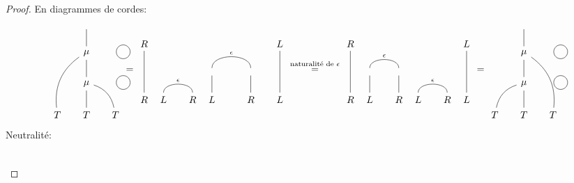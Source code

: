 \documentclass[math, info]{cours}
\begin{document}
\begin{proof}
	En diagrammes de cordes:
	\begin{equation*}
		\begin{tikzcd}[remember picture]
			&[-10pt]\phantom{}\ar[d, no head] &[-10pt]\\
			& |[alias=mu]|\mu & \\
			& |[alias=mu2]|\mu\ar[u, no head] & \\
			T\ar[uur, no head, bend left] & T\ar[u, no head] & T\ar[ul, bend right, no head]
		\end{tikzcd}
		\begin{tikzpicture}[remember picture, overlay]
			\draw (mu) circle (.25cm) {};
			\draw (mu2) circle (.25cm) {};
		\end{tikzpicture}
		 =
		 \begin{tikzcd}
			 R &[-20pt] &[-10pt] &[-20pt] & &[-10pt] L\\
			 & & & \phantom{}\ar[r, bend left=90, no head, "\epsilon"] & \phantom{} & \\
			 R\ar[uu, no head] & L\ar[r, bend left=90, no head, "\epsilon"] & R & L\ar[u, no head] & R\ar[u, no head] & L\ar[uu, no head]
		 \end{tikzcd}
		 \overset{\text{naturalité de $\epsilon$}}{=}
		 \begin{tikzcd}
			 R &[-20pt] &[-10pt] &[-20pt] &[-10pt] &[-20pt] L\\
			 & \phantom{}\ar[r, bend left=90, no head, "\epsilon"] & \phantom{} & & & \\
			 R\ar[uu, no head] & L\ar[u, no head] & R\ar[u, no head] &  L\ar[r, bend left=90, "\epsilon", no head] & R & L\ar[uu, no head]
		 \end{tikzcd}
		 =
		 \begin{tikzcd}[remember picture]
			 &[-10pt]\phantom{}\ar[d, no head] &[-10pt]\\
			& |[alias=mu]|\mu\ar[d, no head] & \\
			& |[alias=mu2]|\mu &\\
			T\ar[ur, no head, bend left] & T\ar[u, no head] & T\ar[uul, no head, bend right]
		 \end{tikzcd}
		\begin{tikzpicture}[remember picture, overlay]
			\draw (mu) circle (.25cm) {};
			\draw (mu2) circle (.25cm) {};
		\end{tikzpicture}
	\end{equation*}
	Neutralité:
	\begin{equation*}
		\begin{tikzcd}

\end{tikzcd}
\end{equation*}
\end{proof}
\end{document}
